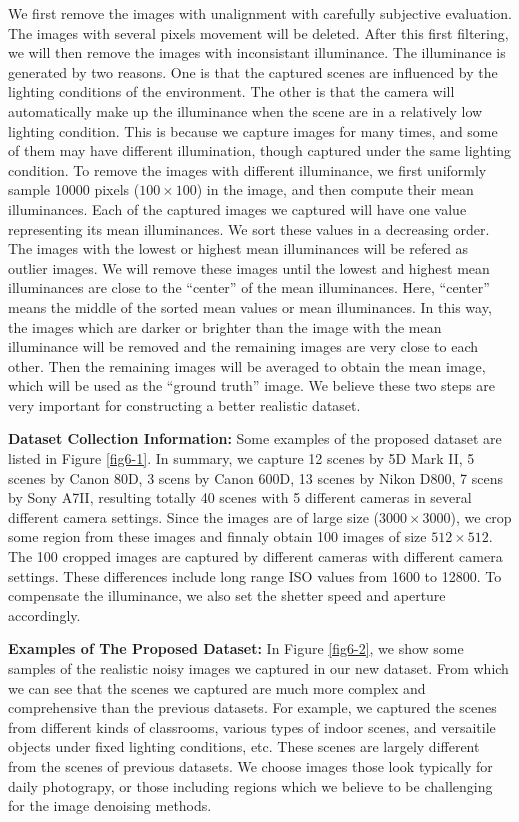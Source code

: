 We first remove the images with unalignment with carefully subjective evaluation. The images with several pixels movement will be deleted. After this first filtering, we will then remove the images with inconsistant illuminance. The illuminance is generated by two reasons. One is that the captured scenes are influenced by the lighting conditions of the environment. The other is that the camera will automatically make up the illuminance when the scene are in a relatively low lighting condition. This is because we capture images for many times, and some of them may have different illumination, though captured under the same lighting condition. To remove the images with different illuminance, we first uniformly sample 10000 pixels ($100\times100$) in the image, and then compute their mean illuminances. Each of the captured images we captured will have one value representing its mean illuminances. We sort these values in a decreasing order. The images with the lowest or highest mean illuminances will be refered as outlier images. We will remove these images until the lowest and highest mean illuminances are close to the ``center'' of the mean illuminances. Here, ``center'' means the middle of the sorted mean values or mean illuminances. In this way, the images which are darker or brighter than the image with the mean illuminance will be removed and the remaining images are very close to each other. Then the remaining images will be averaged to obtain the mean image, which will be used as the ``ground truth'' image. We believe these two steps are very important for constructing a better realistic dataset.


\textbf{Dataset Collection Information:} Some examples of the proposed dataset are listed in Figure \ref{fig6-1}. In summary, we capture 12 scenes by 5D Mark II, 5 scenes by Canon 80D, 3 scens by Canon 600D, 13 scenes by Nikon D800, 7 scens by Sony A7II, resulting totally 40 scenes with 5 different cameras in several different camera settings. Since the images are of large size ($3000\times3000$), we crop some region from these images and finnaly obtain 100 images of size $512\times512$. The 100 cropped images are captured by different cameras with different camera settings. These differences include long range ISO values from 1600 to 12800. To compensate the illuminance, we also set the shetter speed and aperture accordingly. 



\textbf{Examples of The Proposed Dataset:} In Figure \ref{fig6-2}, we show some samples of the realistic noisy images we captured in our new dataset. From which we can see that the scenes we captured are much more complex and comprehensive than the previous datasets. For example, we captured the scenes from different kinds of classrooms, various types of indoor scenes, and versaitile objects under fixed lighting conditions, etc. These scenes are largely different from the scenes of previous datasets. We choose images those look typically for daily photograpy, or those including regions which we believe to be challenging for the image denoising methods.



